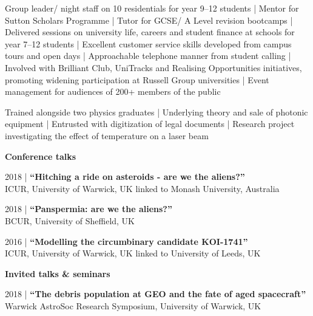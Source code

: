 \documentclass[10pt,a4paper]{altacv}
\begin{document}
\divider

\vspace{-1em}
\small \justify Group leader/ night staff on 10 residentials for year 9--12 students |
Mentor for Sutton Scholars Programme | 
Tutor for GCSE/ A Level revision bootcamps |
Delivered sessions on university life, careers and student finance at schools for year 7--12 students |
Excellent customer service skills developed from campus tours and open days |
Approachable telephone manner from student calling |
Involved with Brilliant Club, UniTracks and Realising Opportunities initiatives, promoting widening participation at Russell Group universities |
Event management for audiences of 200+ members of the public

\divider

\vspace{-1em}
\small \justify Trained alongside two physics graduates | 
Underlying theory and sale of photonic equipment |
Entrusted with digitization of legal documents |
Research project investigating the effect of temperature on a laser beam

\clearpage


\normalsize \textbf{Conference talks}

\medskip

\small 2018 | \textbf{``Hitching a ride on asteroids - are we the aliens?''} \\
ICUR, University of Warwick, UK linked to Monash University, Australia

\smallskip

\small 2018 | \textbf{``Panspermia: are we the aliens?''} \\
BCUR, University of Sheffield, UK

\smallskip

\small 2016 | \textbf{``Modelling the circumbinary candidate KOI-1741''} \\
ICUR, University of Warwick, UK linked to University of Leeds, UK

\divider

\normalsize \textbf{Invited talks \& seminars}

\medskip

\small 2018 | \textbf{``The debris population at GEO and the fate of aged spacecraft''} \\
Warwick AstroSoc Research Symposium, University of Warwick, UK
\end{document}

